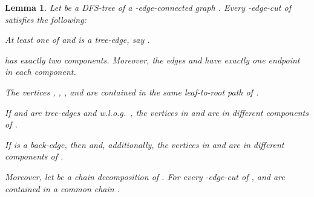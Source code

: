 \documentclass[paper=a4]{scrartcl}
\newtheorem{lemma}{Lemma}
\begin{document}
\begin{lemma}\label{lem:facts about cuts}
Let  be a DFS-tree of a -edge-connected graph . Every -edge-cut  of  satisfies the following:

\begin{compactenum}[(1)]
  \item At least one of  and  is a tree-edge, say .\label{not both backedges}
  \item  has exactly two components. Moreover, the edges  and  have exactly one endpoint in each component.\label{endpoints disconnected}
  \item The vertices , , , and  are contained in the same leaf-to-root path of .\label{on a tree path}
  \item If  and  are tree-edges and w.l.o.g.\ , the vertices in  and  are in different components of .\label{components two tree-edges}
  \item If  is a back-edge, then  and, additionally, the vertices in  and  are in different components of .\label{components back and tree-edge}
\end{compactenum}\smallskip
\noindent Moreover, let  be a chain decomposition of . For every -edge-cut  of ,  and  are contained in a common chain .

\end{lemma}
\end{document}
